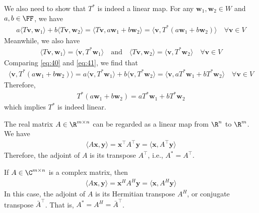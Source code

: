 \documentclass[thmcnt=section, color=blue, 12pt]{my-elegantbook}
\begin{document}
We also need to show that $T^\ast$ is indeed a linear map.
For any $\mathbf{w}_1, \mathbf{w}_2 \in W$ and $a, b \in \FF$, we have 
\begin{align}
	a \langle T \mathbf{v}, \mathbf{w}_1 \rangle
	+ b \langle T \mathbf{v}, \mathbf{w}_2 \rangle
	= \langle T \mathbf{v}, a \mathbf{w}_1 + b \mathbf{w}_2 \rangle
	= \langle \mathbf{v}, T^\ast (a \mathbf{w}_1 + b \mathbf{w}_2) \rangle
	\quad \forall \mathbf{v} \in V
	\label{eq:40}
\end{align}
Meanwhile, we also have 
\begin{align}
	\langle T \mathbf{v}, \mathbf{w}_1 \rangle
	= \langle \mathbf{v}, T^\ast \mathbf{w}_1 \rangle
	\quad \text{and} \quad
	\langle T \mathbf{v}, \mathbf{w}_2 \rangle
	= \langle \mathbf{v}, T^\ast \mathbf{w}_2 \rangle
	\quad \forall \mathbf{v} \in V
	\label{eq:41}
\end{align}
Comparing \eqref{eq:40} and \eqref{eq:41}, we find that 
\begin{align*}
	\langle \mathbf{v}, T^\ast (a \mathbf{w}_1 + b \mathbf{w}_2) \rangle
	= a \langle \mathbf{v}, T^\ast \mathbf{w}_1 \rangle
	+ b \langle \mathbf{v}, T^\ast \mathbf{w}_2 \rangle
	= \langle \mathbf{v}, a T^\ast \mathbf{w}_1 + b T^\ast \mathbf{w}_2 \rangle
	\quad \forall \mathbf{v} \in V
\end{align*}
Therefore, 
\begin{align*}
	T^\ast (a \mathbf{w}_1 + b \mathbf{w}_2)
	= a T^\ast \mathbf{w}_1 + b T^\ast \mathbf{w}_2
\end{align*}
which implies $T^\ast$ is indeed linear.

\begin{example} \label{eg:4}
	The real matrix $A \in \R^{m \times n}$
	can be regarded as a linear map from $\R^n$ to $\R^m$.
	We have 
	\begin{align*}
		\langle A \mathbf{x}, \mathbf{y} \rangle
		= \mathbf{x}^\top A^\top \mathbf{y}
		= \langle \mathbf{x}, A^\top \mathbf{y} \rangle
	\end{align*}
	Therefore, the adjoint of $A$ is its transpose $A^\top$, 
	i.e., $A^\ast = A^\top$.

	If $A \in \C^{m \times n}$ is a complex matrix, then 
	\begin{align*}
		\langle A \mathbf{x}, \mathbf{y} \rangle
		= \mathbf{x}^H A^H \mathbf{y}
		= \langle \mathbf{x}, A^H \mathbf{y} \rangle
	\end{align*}
	In this case, the adjoint of $A$ is 
	its Hermitian transpose $A^H$, or conjugate transpose ${\bar{A}}^\top$.
	That is, $A^\ast = A^H = {\bar{A}}^\top$.
\end{example}
\end{document}
